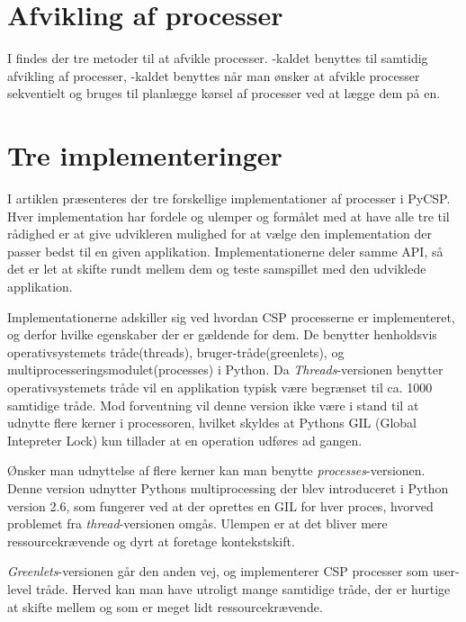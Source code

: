 \section{Afvikling af processer}
I \pycsp findes der tre metoder til at afvikle processer. -kaldet benyttes til samtidig afvikling af processer, -kaldet benyttes når man ønsker at afvikle processer sekventielt og  bruges til planlægge kørsel af processer ved at lægge dem på \sched en. 


\section{Tre implementeringer}
I artiklen \cite{Friborg2009} præsenteres der tre forskellige implementationer af processer i PyCSP. Hver implementation har fordele og ulemper og formålet med at have alle tre til rådighed er at give udvikleren mulighed for at vælge den implementation der passer bedst til en given applikation. Implementationerne deler samme API, så det er let at skifte rundt mellem dem og teste samspillet med den udviklede applikation. 

Implementationerne adskiller sig ved hvordan CSP processerne er implementeret, og derfor hvilke egenskaber der er gældende for dem. De benytter henholdsvis operativsystemets tråde(threads), bruger-tråde(greenlets), og multiprocesseringsmodulet(processes) i Python. Da \emph{Threads}-versionen benytter operativsystemets tråde vil en applikation typisk være begrænset til ca. 1000 samtidige tråde. Mod forventning vil denne version ikke være i stand til at udnytte flere kerner i processoren, hvilket skyldes at Pythons GIL (Global Intepreter Lock) kun tillader at en operation udføres ad gangen. 

Ønsker man udnyttelse af flere kerner kan man benytte \emph{processes}-versionen. Denne version udnytter Pythons multiprocessing der blev introduceret i Python version 2.6, som fungerer ved at der oprettes en GIL for hver proces, hvorved problemet fra \emph{thread}-versionen omgås. Ulempen er at det bliver mere ressourcekrævende og dyrt at foretage kontekstskift. 

\emph{Greenlets}-versionen går den anden vej, og implementerer CSP processer som user-level tråde. Herved kan man have utroligt mange samtidige tråde, der er hurtige at skifte mellem og som er meget lidt ressourcekrævende. 

